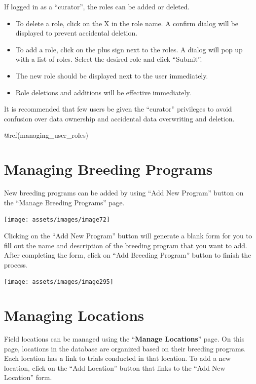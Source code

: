 \documentclass[
  12pt,
]{book}
\providecommand{\tightlist}{%
  \setlength{\itemsep}{0pt}\setlength{\parskip}{0pt}}
\begin{document}
If logged in as a ``curator'', the roles can be added or deleted.

\begin{itemize}
\tightlist
\item
  To delete a role, click on the X in the role name. A confirm dialog will be displayed to prevent accidental deletion.
\item
  To add a role, click on the plus sign next to the roles. A dialog will pop up with a list of roles. Select the desired role and click ``Submit''.
\item
  The new role should be displayed next to the user immediately.
\item
  Role deletions and additions will be effective immediately.
\end{itemize}

It is recommended that few users be given the ``curator'' privileges to avoid confusion over data ownership and accidental data overwriting and deletion.

@ref(managing\_user\_roles)

\hypertarget{managing-breeding-programs}{%
\chapter{Managing Breeding Programs}\label{managing-breeding-programs}}

New breeding programs can be added by using ``Add New Program'' button on the ``Manage Breeding Programs'' page.

\begin{center}\texttt{[image: assets/images/image72]} \end{center}

Clicking on the ``Add New Program'' button will generate a blank form for you to fill out the name and description of the breeding program that you want to add. After completing the form, click on ``Add Breeding Program'' button to finish the process.

\begin{center}\texttt{[image: assets/images/image295]} \end{center}

\hypertarget{managing-locations}{%
\chapter{Managing Locations}\label{managing-locations}}

Field locations can be managed using the ``\textbf{Manage Locations}'' page. On this page, locations in the database are organized based on their breeding programs. Each location has a link to trials conducted in that location. To add a new location, click on the ``Add Location'' button that links to the ``Add New Location'' form.
\end{document}
